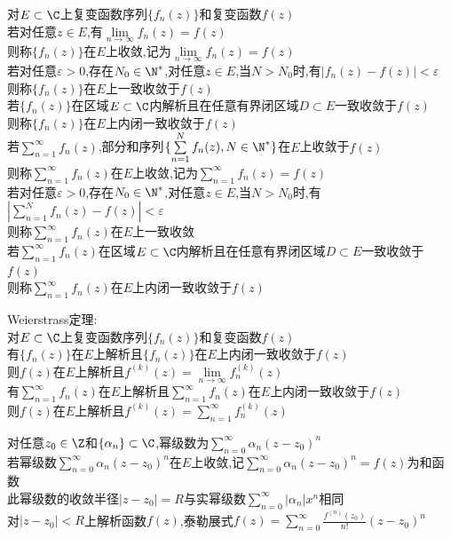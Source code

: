 \begin{dingyi}
对$E\subset \C$上复变函数序列$\{f_n(z)\}$和复变函数$f(z)$\\
若对任意$z\in E$,有$\lim\limits_{n\to \infty}f_n(z)=f(z)$\\
则称$\{f_n(z)\}$在$E$上收敛,记为$\lim\limits_{n\to \infty}f_n(z)=f(z)$\\
若对任意$\varepsilon>0$,存在$N_0\in \N^*$,对任意$z\in E$,当$N>N_0$时,有$|f_n(z)-f(z)|<\varepsilon$\\
则称$\{f_n(z)\}$在$E$上一致收敛于$f(z)$\\
若$\{f_n(z)\}$在区域$E\subset \C$内解析且在任意有界闭区域$D\subset E$一致收敛于$f(z)$\\
则称$\{f_n(z)\}$在$E$上内闭一致收敛于$f(z)$\\
若$\sum\limits_{n=1}^{\infty}f_n(z)$,部分和序列$\{\sum\limits_{n=1}^{N}f_n(z),N\in \N^*\}$在$E$上收敛于$f(z)$\\
则称$\sum\limits_{n=1}^{\infty}f_n(z)$在$E$上收敛,记为$\sum\limits_{n=1}^{\infty}f_n(z)=f(z)$\\
若对任意$\varepsilon>0$,存在$N_0\in \N^*$,对任意$z\in E$,当$N>N_0$时,有$|\sum\limits_{n=1}^{N}f_n(z)-f(z)|<\varepsilon$\\
则称$\sum\limits_{n=1}^{\infty}f_n(z)$在$E$上一致收敛\\
若$\sum\limits_{n=1}^{\infty}f_n(z)$在区域$E\subset \C$内解析且在任意有界闭区域$D\subset E$一致收敛于$f(z)$\\
则称$\sum\limits_{n=1}^{\infty}f_n(z)$在$E$上内闭一致收敛于$f(z)$
\end{dingyi}

\begin{dingli}
Weierstrass定理:\\
对$E\subset \C$上复变函数序列$\{f_n(z)\}$和复变函数$f(z)$\\
有$\{f_n(z)\}$在$E$上解析且$\{f_n(z)\}$在$E$上内闭一致收敛于$f(z)$\\
则$f(z)$在$E$上解析且$f^{(k)}(z)=\lim\limits_{n\to \infty}f_n^{(k)}(z)$\\
有$\sum\limits_{n=1}^{\infty}f_n(z)$在$E$上解析且$\sum\limits_{n=1}^{\infty}f_n(z)$在$E$上内闭一致收敛于$f(z)$\\
则$f(z)$在$E$上解析且$f^{(k)}(z)=\sum\limits_{n=1}^{\infty}f_n^{(k)}(z)$
\end{dingli}

\begin{dingyi}
对任意$z_0\in \Z$和$\{\alpha_n\}\subset \C$,幂级数为$\sum\limits_{n=0}^{\infty}\alpha_n(z-z_0)^n$\\
若幂级数$\sum\limits_{n=0}^{\infty}\alpha_n(z-z_0)^n$在$E$上收敛,记$\sum\limits_{n=0}^{\infty}\alpha_n(z-z_0)^n=f(z)$为和函数\\
此幂级数的收敛半径$|z-z_0|=R$与实幂级数$\sum\limits_{n=0}^{\infty}|\alpha_n|x^n$相同\\
对$|z-z_0|<R$上解析函数$f(z)$,泰勒展式$f(z)=\sum\limits_{n=0}^{\infty}\frac{f^{(n)}(z_0)}{n!}(z-z_0)^n$
\end{dingyi}

